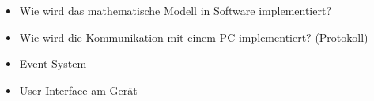 \begin{itemize}
    \item
        Wie wird das mathematische Modell in Software implementiert?
    \item
        Wie wird die Kommunikation mit einem PC implementiert? (Protokoll)
    \item
        Event-System
    \item
        User-Interface am Ger\"at
\end{itemize}
